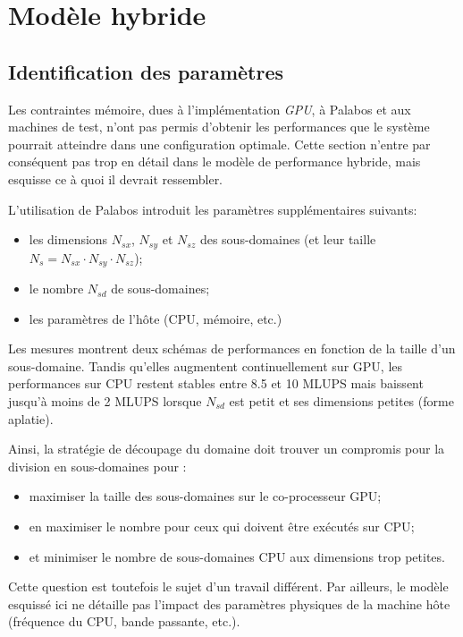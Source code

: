 \section{Modèle hybride}
\subsection{Identification des paramètres}
Les contraintes mémoire, dues à l'implémentation \textit{GPU}, à Palabos et aux machines de test, n'ont pas permis d'obtenir les performances que le système pourrait atteindre dans une configuration optimale. Cette section n'entre par conséquent pas trop en détail dans le modèle de performance hybride, mais esquisse ce à quoi il devrait ressembler. 

L'utilisation de Palabos introduit les paramètres supplémentaires suivants:
\begin{itemize}
\item les dimensions $N_{sx}$, $N_{sy}$ et $N_{sz}$ des sous-domaines (et leur taille $N_{s} = N_{sx}\cdot N_{sy}\cdot N_{sz}$);
\item le nombre $N_{sd}$ de sous-domaines;
\item les paramètres de l'hôte (\acs{CPU}, mémoire, etc.)
\end{itemize}

Les mesures montrent  deux schémas de performances en fonction de la taille d'un sous-domaine. Tandis qu’elles augmentent continuellement sur \acs{GPU}, les performances sur \acs{CPU} restent stables entre 8.5 et 10 \acs{MLUPS} mais baissent jusqu'à moins de 2 \acs{MLUPS} lorsque $N_{sd}$ est petit et ses dimensions petites (forme aplatie).

Ainsi,  la stratégie de découpage du domaine doit trouver un compromis pour la division en sous-domaines pour :
\begin{itemize}
\item maximiser la taille des sous-domaines sur le co-processeur \acs{GPU};
\item en maximiser le nombre pour ceux qui doivent être exécutés sur \acs{CPU};
\item et minimiser le nombre de sous-domaines \acs{CPU} aux dimensions trop petites.
\end{itemize}

\noindent Cette question est toutefois le sujet d'un travail différent. Par ailleurs, le modèle esquissé ici ne détaille pas l'impact des paramètres physiques de la machine hôte (fréquence du \acs{CPU}, bande passante, etc.).

